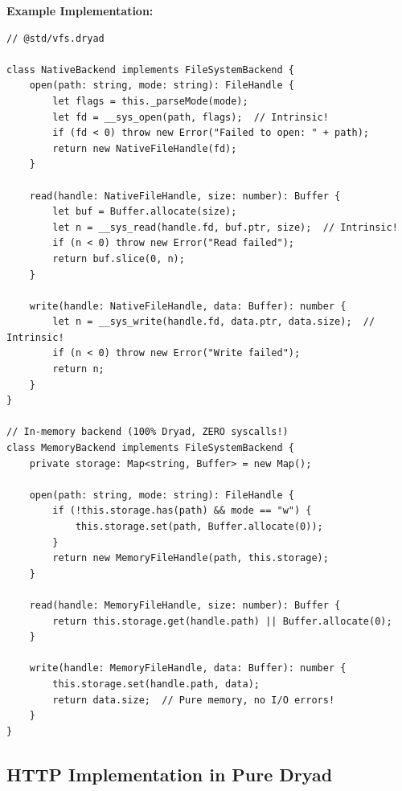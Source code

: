 \documentclass[12pt,a4paper]{article}
\theoremstyle{definition}
\begin{document}
\textbf{Example Implementation:}
\begin{lstlisting}[language=Dryad]
// @std/vfs.dryad

class NativeBackend implements FileSystemBackend {
    open(path: string, mode: string): FileHandle {
        let flags = this._parseMode(mode);
        let fd = __sys_open(path, flags);  // Intrinsic!
        if (fd < 0) throw new Error("Failed to open: " + path);
        return new NativeFileHandle(fd);
    }
    
    read(handle: NativeFileHandle, size: number): Buffer {
        let buf = Buffer.allocate(size);
        let n = __sys_read(handle.fd, buf.ptr, size);  // Intrinsic!
        if (n < 0) throw new Error("Read failed");
        return buf.slice(0, n);
    }
    
    write(handle: NativeFileHandle, data: Buffer): number {
        let n = __sys_write(handle.fd, data.ptr, data.size);  // Intrinsic!
        if (n < 0) throw new Error("Write failed");
        return n;
    }
}

// In-memory backend (100% Dryad, ZERO syscalls!)
class MemoryBackend implements FileSystemBackend {
    private storage: Map<string, Buffer> = new Map();
    
    open(path: string, mode: string): FileHandle {
        if (!this.storage.has(path) && mode == "w") {
            this.storage.set(path, Buffer.allocate(0));
        }
        return new MemoryFileHandle(path, this.storage);
    }
    
    read(handle: MemoryFileHandle, size: number): Buffer {
        return this.storage.get(handle.path) || Buffer.allocate(0);
    }
    
    write(handle: MemoryFileHandle, data: Buffer): number {
        this.storage.set(handle.path, data);
        return data.size;  // Pure memory, no I/O errors!
    }
}
\end{lstlisting}

\subsection{HTTP Implementation in Pure Dryad}
\end{document}
